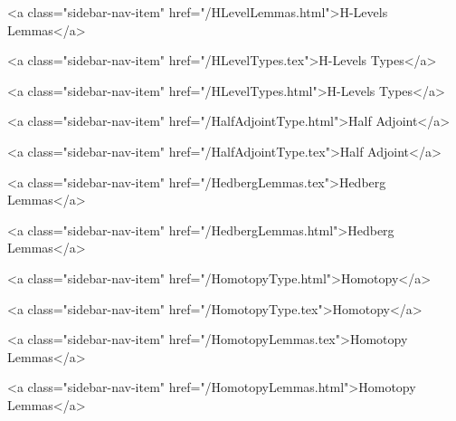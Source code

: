       
        
          <a class="sidebar-nav-item" href="/HLevelLemmas.html">H-Levels Lemmas</a>
        
      
    
      
        
          <a class="sidebar-nav-item" href="/HLevelTypes.tex">H-Levels Types</a>
        
      
    
      
        
          <a class="sidebar-nav-item" href="/HLevelTypes.html">H-Levels Types</a>
        
      
    
      
        
          <a class="sidebar-nav-item" href="/HalfAdjointType.html">Half Adjoint</a>
        
      
    
      
        
          <a class="sidebar-nav-item" href="/HalfAdjointType.tex">Half Adjoint</a>
        
      
    
      
        
          <a class="sidebar-nav-item" href="/HedbergLemmas.tex">Hedberg Lemmas</a>
        
      
    
      
        
          <a class="sidebar-nav-item" href="/HedbergLemmas.html">Hedberg Lemmas</a>
        
      
    
      
        
          <a class="sidebar-nav-item" href="/HomotopyType.html">Homotopy</a>
        
      
    
      
        
          <a class="sidebar-nav-item" href="/HomotopyType.tex">Homotopy</a>
        
      
    
      
        
          <a class="sidebar-nav-item" href="/HomotopyLemmas.tex">Homotopy Lemmas</a>
        
      
    
      
        
          <a class="sidebar-nav-item" href="/HomotopyLemmas.html">Homotopy Lemmas</a>
        
      
    
